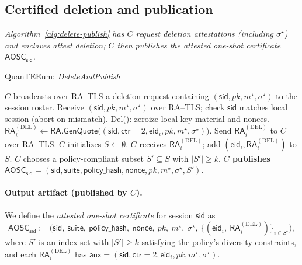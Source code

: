 \documentclass[runningheads,orivec]{llncs}
\newcommand{\prot}{\textsf{QuanTEEum}}
\newcommand{\sid}{\mathsf{sid}}
\begin{document}
\subsection{Certified deletion and publication}
\emph{Algorithm~\ref{alg:delete-publish} has $C$ request deletion attestations (including $\sigma^{\star}$) and enclaves attest deletion; $C$ then publishes the attested one-shot certificate $\mathsf{AOSC}_\sid$.}

\begin{algorithm}[!htbp]
\caption{\prot{}: \emph{DeleteAndPublish}}
\label{alg:delete-publish}
\begin{small}
\begin{algorithmic}[1]
\State \textbf{$C$} broadcasts over RA--TLS a deletion request containing $(\sid,pk,m^{\star},\sigma^{\star})$ to the session roster.
  \State Receive $(\sid,pk,m^{\star},\sigma^{\star})$ over RA--TLS; check $\sid$ matches local session (abort on mismatch).
  \State \textsf{Del}(): zeroize local key material and nonces.
  \State $\mathsf{RA}^{(\mathrm{DEL})}_i \gets \textsf{RA.GenQuote}\big((\sid,\mathsf{ctr}{=}2,\mathsf{eid}_i,pk,m^{\star},\sigma^{\star})\big)$.
  \State Send $\mathsf{RA}^{(\mathrm{DEL})}_i$ to \textbf{$C$} over RA--TLS.
\EndFor
\State \textbf{$C$} initializes $S \gets \emptyset$.
  \State \textbf{$C$} receives $\mathsf{RA}^{(\mathrm{DEL})}_i$; add $(\mathsf{eid}_i,\mathsf{RA}^{(\mathrm{DEL})}_i)$ to $S$.
\EndFor
\State \textbf{$C$} chooses a policy-compliant subset $S' \subseteq S$ with $|S'|\ge k$.
\State \textbf{$C$ publishes} $\mathsf{AOSC}_\sid = (\sid,\mathsf{suite},\mathsf{policy\_hash},\mathsf{nonce},pk,m^{\star},\sigma^{\star},S')$.
\end{algorithmic}
\end{small}
\end{algorithm}

\paragraph{Output artifact (published by $C$).}
We define the \emph{attested one-shot certificate} for session $\sid$ as
\[
\mathsf{AOSC}_\sid := \big(\sid,\ \mathsf{suite},\ \mathsf{policy\_hash},\ \mathsf{nonce},\ pk,\ m^{\star},\ \sigma^{\star},\ \{(\mathsf{eid}_i,\ \mathsf{RA}^{(\mathrm{DEL})}_i)\}_{i\in S'}\big),
\]
where $S'$ is an index set with $|S'|\ge k$ satisfying the policy’s diversity constraints, and each
$\mathsf{RA}^{(\mathrm{DEL})}_i$ has $\mathsf{aux}=(\sid,\mathsf{ctr}{=}2,\mathsf{eid}_i,pk,m^{\star},\sigma^{\star})$.
\end{document}

